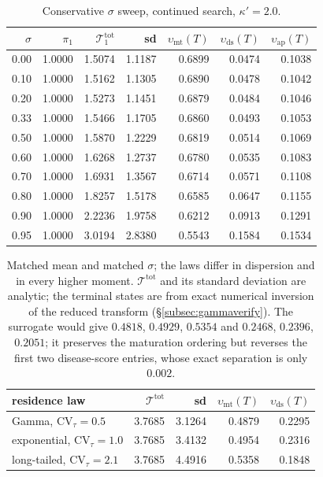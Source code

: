 \documentclass[pdflatex,sn-mathphys-num]{sn-jnl}
\numberwithin{equation}{section}
\theoremstyle{thmstyleone}%
\theoremstyle{definition}
\theoremstyle{remark}
\begin{document}
\begin{table}[htbp]\centering\small
\caption{Conservative $\sigma$ sweep, continued search, $\kappa'=2.0$.}
\label{tab:sigma}
\begin{tabular}{@{}rrrrrrr@{}}
\toprule
$\sigma$&$\pi_1$&$\mathcal T^{\mathrm{tot}}_1$&sd&
$\upsilon_{\mathrm{mt}}(T)$&$\upsilon_{\mathrm{ds}}(T)$&$\upsilon_{\mathrm{ap}}(T)$\\
\midrule
0.00&1.0000&1.5074&1.1187&0.6899&0.0474&0.1038\\
0.10&1.0000&1.5162&1.1305&0.6890&0.0478&0.1042\\
0.20&1.0000&1.5273&1.1451&0.6879&0.0484&0.1046\\
0.33&1.0000&1.5466&1.1705&0.6860&0.0493&0.1053\\
0.50&1.0000&1.5870&1.2229&0.6819&0.0514&0.1069\\
0.60&1.0000&1.6268&1.2737&0.6780&0.0535&0.1083\\
0.70&1.0000&1.6931&1.3567&0.6714&0.0571&0.1108\\
0.80&1.0000&1.8257&1.5178&0.6585&0.0647&0.1155\\
0.90&1.0000&2.2236&1.9758&0.6212&0.0913&0.1291\\
0.95&1.0000&3.0194&2.8380&0.5543&0.1584&0.1534\\
\bottomrule
\end{tabular}
\end{table}

\begin{table}[htbp]\centering\small
\caption{Matched mean and matched $\sigma$; the laws differ in dispersion and
in every higher moment. $\mathcal T^{\mathrm{tot}}$ and its standard deviation
are analytic; the terminal states are from exact numerical inversion of
the reduced transform (\S\ref{subsec:gammaverify}). The surrogate would give $0.4818$, $0.4929$, $0.5354$ and $0.2468$, $0.2396$, $0.2051$; it preserves the maturation ordering but reverses the first two disease-score entries, whose exact separation is only $0.002$.}
\label{tab:residence}
\begin{tabular}{@{}lrrrr@{}}
\toprule
residence law&$\mathcal T^{\mathrm{tot}}$&sd&
$\upsilon_{\mathrm{mt}}(T)$&$\upsilon_{\mathrm{ds}}(T)$\\
\midrule
Gamma, $\mathrm{CV}_\tau=0.5$&3.7685&3.1264&0.4879&0.2295\\
exponential, $\mathrm{CV}_\tau=1.0$&3.7685&3.4132&0.4954&0.2316\\
long-tailed, $\mathrm{CV}_\tau=2.1$&3.7685&4.4916&0.5358&0.1848\\
\bottomrule
\end{tabular}
\end{table}
\end{document}
